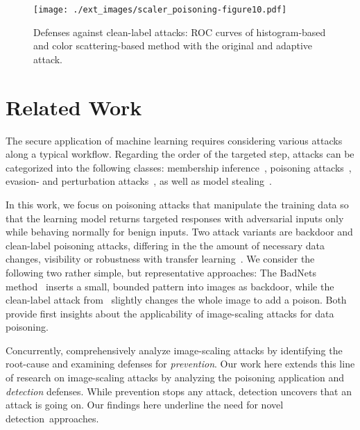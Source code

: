 \documentclass[conference]{IEEEtran}
\begin{document}
\begin{figure}
	\centering
	\texttt{[image: ./ext\_images/scaler\_poisoning-figure10.pdf]}
	\vspace{-0.85em}
	\caption{Defenses against clean-label attacks: ROC curves of 
		histogram-based and color scattering-based method with the 
		original 
		and adaptive attack.}
	\label{fig:results_detection_cleanlabel}
\end{figure}


 
\section{Related Work}\label{sec:relatedwork}
The secure application of machine learning requires considering 
various attacks along a typical workflow. 
Regarding the order of the targeted step, attacks can be
categorized into the following classes:
membership inference~\citep[e.g.,][]{ShoStrSonShm17}, poisoning 
attacks~\citep[e.g.,][]{BigNelLas11, GuDolGar17, LiuMaAaf+18}, 
evasion- and perturbation
attacks~\citep[e.g.,][]{BigCorMai+13,CarWag17,QuiMaiRie19}, as
well as model stealing~\citep[e.g.,][]{TraZhaJuel+16}.

In this work, we focus on poisoning attacks that manipulate the 
training data so that the learning model returns targeted 
responses with adversarial inputs only while behaving normally for 
benign inputs. Two attack variants are backdoor and clean-label 
poisoning attacks, differing in the the amount of necessary data 
changes, visibility or robustness with {transfer\EndAccSupp{}} 
learning~\citep[e.g.][]{GuDolGar17, CheLiuLi+17, ShaHuaNaj+18, 
LiuMaAaf+18, YaoLiZhe+19}. 
We consider the following two rather simple, but representative 
approaches:
The BadNets method~\citep{GuDolGar17} inserts a small, bounded pattern 
into images as backdoor, while the clean-label attack 
from~\citet{ShaHuaNaj+18} slightly changes the whole image to add a 
poison. Both provide first insights about the 
applicability of image-scaling attacks for data poisoning.

Concurrently, \citet{QuiKleArp20} comprehensively analyze 
image-scaling attacks by identifying the root-cause and examining
defenses for \emph{prevention}. Our work here extends this line of 
research on image-scaling attacks by analyzing the poisoning 
application and \emph{detection} defenses.  While prevention stops any 
attack, detection uncovers that an attack is going on. Our findings 
here underline the need for novel detection~approaches.
\end{document}

